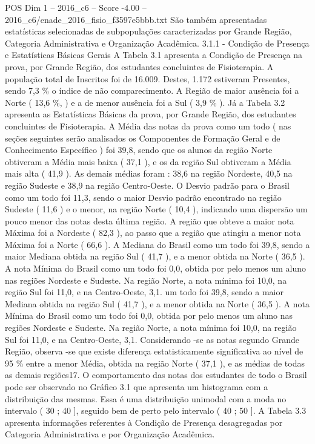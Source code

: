 \begin{textsample}{POS Dim 1 – 2016\_c6 – Score -4.00 – 2016\_c6/enade\_2016\_fisio\_f3597e5bbb.txt}
São também apresentadas estatísticas selecionadas de subpopulações caracterizadas por Grande Região, Categoria Administrativa e Organização Acadêmica. 3.1.1 - Condição de Presença e Estatísticas Básicas Gerais A Tabela 3.1 apresenta a Condição de Presença na prova, por Grande Região, dos estudantes concluintes de Fisioterapia.
A população total de Inscritos foi de 16.009.
Destes, 1.172 estiveram Presentes, sendo 7,3 \% o índice de não comparecimento.
A Região de maior ausência foi a Norte ( 13,6 \%, ) e a de menor ausência foi a Sul ( 3,9 \% ).
Já a Tabela 3.2 apresenta as Estatísticas Básicas da prova, por Grande Região, dos estudantes concluintes de Fisioterapia.
A Média das notas da prova como um todo ( nas seções seguintes serão analisados os Componentes de Formação Geral e de Conhecimento Específico ) foi 39,8, sendo que os alunos da região Norte obtiveram a Média mais baixa ( 37,1 ), e os da região Sul obtiveram a Média mais alta ( 41,9 ).
As demais médias foram : 38,6 na região Nordeste, 40,5 na região Sudeste e 38,9 na região Centro-Oeste.
O Desvio padrão para o Brasil como um todo foi 11,3, sendo o maior Desvio padrão encontrado na região Sudeste ( 11,6 ) e o menor, na região Norte ( 10,4 ), indicando uma dispersão um pouco menor das notas desta última região.
A região que obteve a maior nota Máxima foi a Nordeste ( 82,3 ), ao passo que a região que atingiu a menor nota Máxima foi a Norte ( 66,6 ).
A Mediana do Brasil como um todo foi 39,8, sendo a maior Mediana obtida na região Sul ( 41,7 ), e a menor obtida na Norte ( 36,5 ).
A nota Mínima do Brasil como um todo foi 0,0, obtida por pelo menos um aluno nas regiões Nordeste e Sudeste.
Na região Norte, a nota mínima foi 10,0, na região Sul foi 11,0, e na Centro-Oeste, 3,1. um todo foi 39,8, sendo a maior Mediana obtida na região Sul ( 41,7 ), e a menor obtida na Norte ( 36,5 ).
A nota Mínima do Brasil como um todo foi 0,0, obtida por pelo menos um aluno nas regiões Nordeste e Sudeste.
Na região Norte, a nota mínima foi 10,0, na região Sul foi 11,0, e na Centro-Oeste, 3,1.
Considerando -se as notas segundo Grande Região, observa -se que existe diferença estatisticamente significativa ao nível de 95 \% entre a menor Média, obtida na região Norte ( 37,1 ), e as médias de todas as demais regiões17.
O comportamento das notas dos estudantes de todo o Brasil pode ser observado no Gráfico 3.1 que apresenta um histograma com a distribuição das mesmas.
Essa é uma distribuição unimodal com a moda no intervalo ( 30 ; 40 ], seguido bem de perto pelo intervalo ( 40 ; 50 ].
A Tabela 3.3 apresenta informações referentes à Condição de Presença desagregadas por Categoria Administrativa e por Organização Acadêmica.

\end{textsample}
